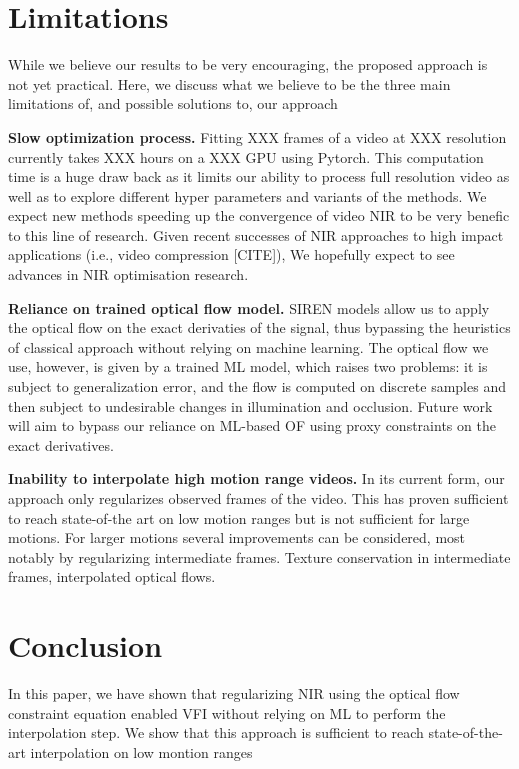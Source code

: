 \documentclass{article}
\begin{document}
\section{Limitations}

While we believe our results to be very encouraging, the proposed approach is not yet practical.
Here, we discuss what we believe to be the three main limitations of, and possible solutions to, our approach

\textbf{Slow optimization process.} Fitting XXX frames of a video at XXX resolution currently takes XXX hours on a XXX GPU using Pytorch.
This computation time is a huge draw back as it limits our ability to process full resolution video as well as
to explore different hyper parameters and variants of the methods.
We expect new methods speeding up the convergence of video NIR to be very benefic to this line of research.
Given recent successes of NIR approaches to high impact applications (i.e., video compression [CITE]),
We hopefully expect to see advances in NIR optimisation research.

\textbf{Reliance on trained optical flow model.}
SIREN models allow us to apply the optical flow on the exact derivaties of the signal,
thus bypassing the heuristics of classical approach without relying on machine learning.
The optical flow we use, however, is given by a trained ML model, which raises two problems:
it is subject to generalization error, and the flow is computed on discrete samples and then subject to
undesirable changes in illumination and occlusion.
Future work will aim to bypass our reliance on ML-based OF using proxy constraints on the exact derivatives.

\textbf{Inability to interpolate high motion range videos.}
In its current form, our approach only regularizes observed frames of the video.
This has proven sufficient to reach state-of-the art on low motion ranges but is not sufficient for large motions.
For larger motions several improvements can be considered, most notably by regularizing intermediate frames.
Texture conservation in intermediate frames, interpolated optical flows.

\section{Conclusion}

In this paper, we have shown that regularizing NIR using the optical flow constraint equation
enabled VFI without relying on ML to perform the interpolation step.
We show that this approach is sufficient to reach state-of-the-art interpolation
on low montion ranges
\end{document}
